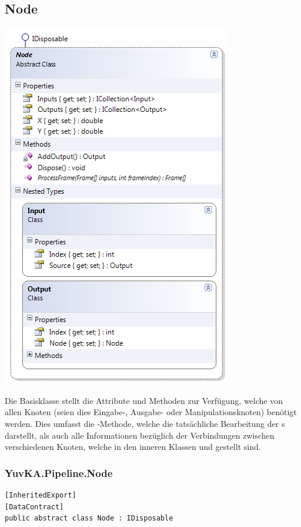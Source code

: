 \subsection{Node}
\begin{center}\includegraphics[scale=0.7]{YuvKA.Pipeline/node.png} \\
\end{center}
Die Basisklasse  stellt die Attribute und Methoden zur Verfügung, welche von allen Knoten (seien dies Eingabe-, Ausgabe- oder Manipulationsknoten) benötigt werden. Dies umfasst die -Methode, welche die tatsächliche Bearbeitung der s darstellt, als auch alle Informationen bezüglich der Verbindungen zwischen verschiedenen Knoten, welche in den inneren Klassen  und  gestellt sind.

\subsubsection{YuvKA.Pipeline.Node}

\begin{verbatim}
[InheritedExport]
[DataContract]
public abstract class Node : IDisposable
\end{verbatim}

